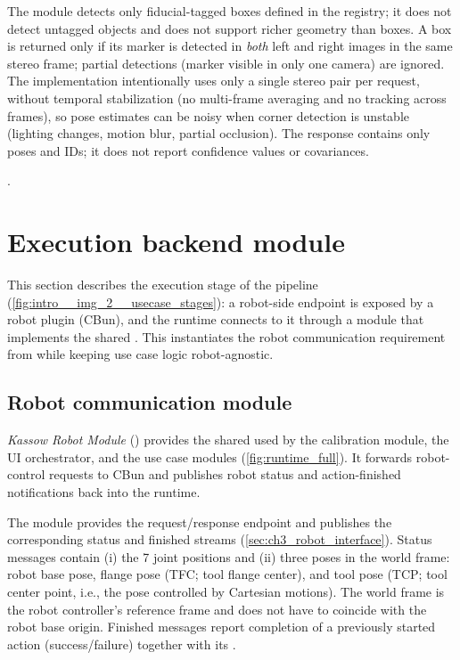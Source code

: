 The module detects only fiducial-tagged boxes defined in the registry; it does not detect untagged objects and does not support richer geometry than boxes.
A box is returned only if its marker is detected in \emph{both} left and right images in the same stereo frame; partial detections (marker visible in only one camera) are ignored.
The implementation intentionally uses only a single stereo pair per  request, without temporal stabilization (no multi-frame averaging and no tracking across frames), so pose estimates can be noisy when corner detection is unstable (lighting changes, motion blur, partial occlusion).
The response contains only poses and IDs; it does not report confidence values or covariances.

.

\section{Execution backend module}
\label{sec:ch4_execution_backend}

This section describes the execution stage of the pipeline (\autoref{fig:intro__img_2__usecase_stages}): a robot-side endpoint is exposed by a robot plugin (CBun), and the runtime connects to it through a module that implements the shared .
This instantiates the robot communication requirement from  while keeping use case logic robot-agnostic.

\subsection{Robot communication module}
\label{subsec:ch4_mod_robot}

\emph{Kassow Robot Module} () provides the shared  used by the calibration module, the UI orchestrator, and the use case modules (\autoref{fig:runtime_full}). It forwards robot-control requests to CBun and publishes robot status and action-finished notifications back into the runtime.

The module provides the  request/response endpoint and publishes the corresponding status and finished streams (\autoref{sec:ch3_robot_interface}).
Status messages contain (i) the 7 joint positions and (ii) three poses in the world frame: robot base pose, flange pose (TFC; tool flange center), and tool pose (TCP; tool center point, i.e., the pose controlled by Cartesian motions).
The world frame is the robot controller's reference frame and does not have to coincide with the robot base origin.
Finished messages report completion of a previously started action (success/failure) together with its .

